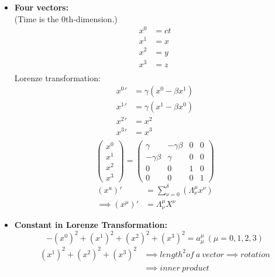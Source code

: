 \documentclass[fleqn,a4paper,12pt]{article}
\begin{document}
\begin{itemize}
    \begin{itemize}
    \item 
      \textbf{Four vectors:}\\
      (Time is the 0th-dimension.)
      \begin{align*}
        x^0  &= ct \\
        x^1 &= x  \\
        x^2 &= y \\
        x^3 &= z \\
      \end{align*}
      Lorenze transformation:
      \begin{align*}
        {x^0}' &= \gamma ( x^0 - \beta x^1 ) \\
        {x^1}' &= \gamma (x^1 - \beta x^0 )  \\
        {x^2}' &= x^2 \\
        {x^3}' &= x^3 \\
      \end{align*}
\[
      \begin{pmatrix}
        x^0\\
        x^1\\
        x^2\\
        x^3
      \end{pmatrix}=
      \begin{pmatrix}
        \gamma & -\gamma \beta & 0 & 0\\
        -\gamma \beta & \gamma & 0 & 0\\
        0 & 0 & 1 & 0\\
        0 & 0 & 0 & 1 
      \end{pmatrix}
\]
      \begin{align*}
        (x^u)' &= \sum_{\nu = 0 }^{\delta} ( \Lambda ^{\mu}_{\nu} x^{\nu} )\\
        \implies (x^\mu)' &= \Lambda ^{\mu}_{\nu} X^{\nu}
      \end{align*}
      \item
        \textbf{Constant in Lorenze Transformation:}\\ 
      \[ -(x^0)^2+(x^1)^2+(x^2)^2 + (x^3)^2 = a_\mu^\mu \  ( \mu=0,1,2,3) \]
      \begin{align*}
        (x^1)^2 + (x^2)^2 + (x^3)^2 &\implies length^2 of\ a\ vector \implies rotation \\
                                    &\implies inner\ product
      \end{align*}


\end{itemize}
\end{itemize}
\end{document}
